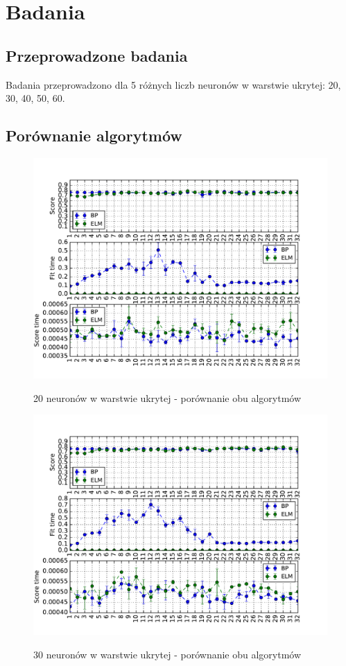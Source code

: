 \chapter{Badania}

\section{Przeprowadzone badania}

Badania przeprowadzono dla 5 różnych liczb neuronów w warstwie ukrytej: 20, 30, 40, 50, 60.

\section{Porównanie algorytmów}

\begin{figure}[h!]
	\centering
	\includegraphics[width=\linewidth]{img/bp_elm_20.pdf}
	\label{Rysunek}
	\caption{20 neuronów w warstwie ukrytej - porównanie obu algorytmów}
\end{figure}

\begin{figure}[h!]
	\centering
	\includegraphics[width=\linewidth]{img/bp_elm_30.pdf}
	\label{Rysunek}
	\caption{30 neuronów w warstwie ukrytej - porównanie obu algorytmów}
\end{figure}

